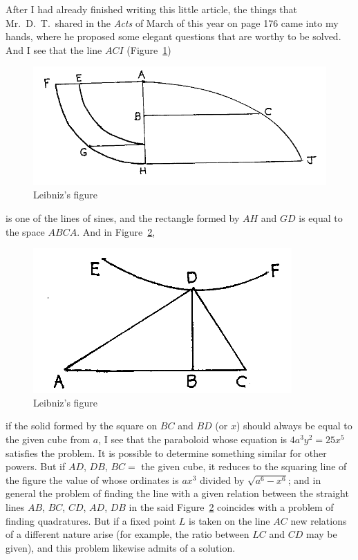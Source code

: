 \documentclass[polutonikogreek,english,twoside,openright]{article}
\begin{document}
After I had already finished writing this little article, the things
that Mr.\ D.\ T.\ shared in the {\em Acts} of March of this year on
page 176 came into my hands, where he proposed some elegant questions
that are worthy to be solved.
And I see that the line $ACI$ (Figure~\ref{Tschirn1})
\begin{figure}[p]
\begin{center}
\includegraphics[width=\textwidth]{fig/Figure54}
\caption{Leibniz's figure}
\label{Tschirn1}
\end{center}
\end{figure}  
is one of the lines of
sines, and the rectangle formed by $AH$ and $GD$ is equal to the space $ABCA$.  And in
Figure~\ref{Tschirn2},
 \begin{figure}[p]
\begin{center}
\includegraphics[width=.6\textwidth]{fig/Figure55}
\caption{Leibniz's figure}
\label{Tschirn2}
\end{center}
\end{figure} if the solid formed by the square on $BC$ and $BD$ (or
$x$) should always be equal to the given cube from $a$, I see that the
paraboloid whose equation is $4a^3 y^2 = 25x^5$ satisfies the problem.
It is possible to determine something similar for other powers.  But
if $AD$, $DB$, $BC =$ the given cube, it reduces to the squaring line
of the figure the value of whose ordinates is $ax^3$ divided by
$\sqrt{a^6- x^6}$; and in general the problem of finding the line with
a given relation between the straight lines $AB$, $BC$, $CD$, $AD$,
$DB$ in the said Figure~\ref{Tschirn2} coincides with a problem of
finding quadratures.  But if a fixed point $L$ is taken on the line
$AC$ new relations of a different nature arise (for example, the ratio
between $LC$ and $CD$ may be given), and this problem likewise admits
of a solution.
\end{document}
